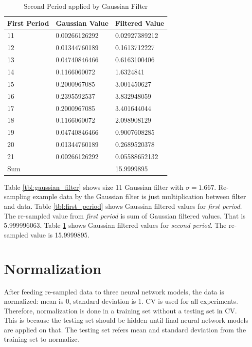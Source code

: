 \documentclass[draft,dvipsnames]{drexel-thesis}
\begin{document}
\begin{thesis}
\begin{table}[!t]
\centering
\caption{Second Period applied by Gaussian Filter}
\label{tbl:second_period}
\begin{small}
\begin{tabular}{|l|l|l|}
\hline
First Period & Gaussian Value & Filtered Value \\ \hline
11           & 0.00266126292  & 0.02927389212  \\
12           & 0.01344760189  & 0.1613712227   \\
13           & 0.04740846466  & 0.6163100406   \\
14           & 0.1166060072   & 1.6324841      \\
15           & 0.2000967085   & 3.001450627    \\
16           & 0.2395592537   & 3.832948059    \\
17           & 0.2000967085   & 3.401644044    \\
18           & 0.1166060072   & 2.098908129    \\
19           & 0.04740846466  & 0.9007608285   \\
20           & 0.01344760189  & 0.2689520378   \\
21           & 0.00266126292  & 0.05588652132  \\ \hline
\multicolumn{2}{|l|}{Sum}     & 15.9999895     \\ \hline
\end{tabular}
\end{small}
\end{table}

Table \ref{tbl:gaussian_filter} shows size 11 Gaussian filter with $\sigma=1.667$. Re-sampling example data by the Gaussian filter is just multiplication between filter and data. Table \ref{tbl:first_period} shows Gaussian filtered values for {\em first period}. The re-sampled value from {\em first period} is sum of Gaussian filtered values. That is 5.999996063. Table \ref{tbl:second_period} shows Gaussian filtered values for {\em second period}. The re-sampled value is 15.9999895.


\section{Normalization}
After feeding re-sampled data to three neural network models, the data is normalized: mean is 0, standard deviation is 1. CV is used for all experiments. Therefore, normalization is done in a training set without a testing set in CV. This is because the testing set should be hidden until final neural network models are applied on that. The testing set refers mean and standard deviation from the training set to normalize.



\end{thesis}
\end{document}
